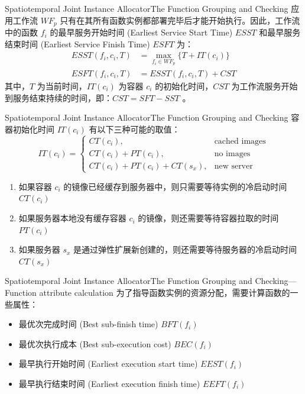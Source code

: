 \documentclass[aspectratio=169]{beamer}
\begin{document}
\begin{frame}{Spatiotemporal Joint Instance Allocator}{The Function Grouping and Checking}
  应用工作流 $WF_p$ 只有在其所有函数实例都部署完毕后才能开始执行。因此，工作流中的函数 $f_i$ 的最早服务开始时间 (Earliest Service Start Time) $ESST$ 和最早服务结束时间 (Earliest Service Finish Time) $ESFT$ 为：
  \begin{align*}
    ESST(f_i,c_i,T) &= \max_{f_i \in WF_p} \{T + IT(c_i)\} \\
    ESFT(f_i,c_i,T) &= ESST(f_i,c_i,T) + CST
  \end{align*}
  其中，$T$ 为当前时间，$IT(c_i)$ 为容器 $c_i$ 的初始化时间，$CST$ 为工作流服务开始到服务结束持续的时间，即：$CST = SFT - SST$ 。
\end{frame}

\begin{frame}{Spatiotemporal Joint Instance Allocator}{The Function Grouping and Checking}
  容器初始化时间 $IT(c_i)$ 有以下三种可能的取值：
  \begin{equation*}
    IT(c_i) =
    \begin{cases}
      CT(c_i), & \text{cached images} \\
      CT(c_i) + PT(c_i), & \text{no images} \\
      CT(c_i) + PT(c_i) + CT(s_x), & \text{new server}
    \end{cases}
  \end{equation*}
  \begin{enumerate}
    \item 如果容器 $c_i$ 的镜像已经缓存到服务器中，则只需要等待实例的冷启动时间 $CT(c_i)$
    \item 如果服务器本地没有缓存容器 $c_i$ 的镜像，则还需要等待容器拉取的时间 $PT(c_i)$
    \item 如果服务器 $s_x$ 是通过弹性扩展新创建的，则还需要等待服务器的冷启动时间 $CT(s_x)$
  \end{enumerate}
\end{frame}

\begin{frame}{Spatiotemporal Joint Instance Allocator}{The Function Grouping and Checking---Function attribute calculation}
  为了指导函数实例的资源分配，需要计算函数的一些属性：
  \begin{itemize}
    \item 最优次完成时间 (Best sub-finish time) $BFT(f_i)$
    \item 最优次执行成本 (Best sub-execution cost) $BEC(f_i)$
    \item 最早执行开始时间 (Earliest execution start time) $EEST(f_i)$
    \item 最早执行结束时间 (Earliest execution finish time) $EEFT(f_i)$
  \end{itemize}
\end{frame}
\end{document}
